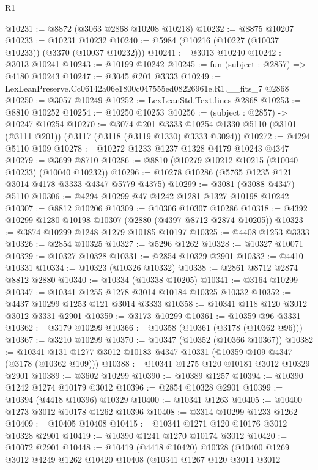 \begin{lexlean}{R1}
\begin{coremodule}
@10231 := @8872 (@3063 @2868 @10208 @10218)
@10232 := @8875 @10207
@10233 := @10231 @10232
@10240 := @5984 (@10216 (@10227 (@10037 @10233)) (@3370 (@10037 @10232)))
@10241 := @3013 @10240
@10242 := @3013 @10241
@10243 := @10199 @10242
@10245 := fun (subject : @2857) => @4180 @10243
@10247 := @3045 @201 @3333
@10249 := LexLeanPreserve.Cc06142a06e1800c047555ed08226961e.R1.__fits_7 @2868
@10250 := @3057 @10249
@10252 := LexLeanStd.Text.lines @2868
@10253 := @8810 @10252
@10254 := @10250 @10253
@10256 := (subject : @2857) -> @10247 @10254
@10270 := @3074
    @201
    @3333
    @10254
    @1330
    @5110
    (@3101 (@3111 @201))
    (@3117 (@3118 (@3119 @1330) @3333 @3094))
@10272 := @4294 @5110 @109
@10278 := @10272 @1233 @1237 @1328 @4179 @10243 @4347
@10279 := @3699 @8710
@10286 := @8810 (@10279 @10212 @10215 (@10040 @10233) (@10040 @10232))
@10296 := @10278 @10286 (@5765 @1235 @121 @3014 @4178 @3333 @4347 @5779 @4375)
@10299 := @3081 (@3088 @4347) @5110
@10306 := @4294 @10299 @47 @1242 @1281 @1327 @10198 @10242
@10307 := @8812 @10206
@10309 := @10306 @10307 @10286
@10318 := @4392 @10299 @1280 @10198 @10307 (@2880 (@4397 @8712 @2874 @10205))
@10323 := @3874 @10299 @1248 @1279 @10185 @10197
@10325 := @4408 @1253 @3333
@10326 := @2854 @10325
@10327 := @5296 @1262
@10328 := @10327 @10071
@10329 := @10327 @10328
@10331 := @2854 @10329 @2901
@10332 := @4410 @10331
@10334 := @10323 (@10326 @10332)
@10338 := @2861 @8712 @2874 @8812 @2880
@10340 := @10334 (@10338 @10205)
@10341 := @3164 @10299
@10347 := @10341 @1255 @1278 @3014 @10184 @10325 @10332
@10352 := @4437 @10299 @1253 @121 @3014 @3333
@10358 := @10341 @118 @120 @3012 @3012 @3331 @2901
@10359 := @3173 @10299
@10361 := @10359 @96 @3331
@10362 := @3179 @10299
@10366 := @10358 (@10361 (@3178 (@10362 @96)))
@10367 := @3210 @10299
@10370 := @10347 (@10352 (@10366 @10367))
@10382 := @10341 @131 @1277 @3012 @10183 @4347 @10331 (@10359 @109 @4347 (@3178 (@10362 @109)))
@10388 := @10341 @1275 @120 @10181 @3012 @10329 @2901
@10389 := @3602 @10299
@10390 := @10389 @1257
@10394 := @10390 @1242 @1274 @10179 @3012
@10396 := @2854 @10328 @2901
@10399 := @10394 (@4418 @10396) @10329
@10400 := @10341 @1263
@10405 := @10400 @1273 @3012 @10178 @1262 @10396
@10408 := @3314 @10299 @1233 @1262
@10409 := @10405 @10408
@10415 := @10341 @1271 @120 @10176 @3012 @10328 @2901
@10419 := @10390 @1241 @1270 @10174 @3012
@10420 := @10072 @2901
@10448 := @10419
    (@4418 @10420)
    @10328
    (@10400
      @1269
      @3012
      @4249
      @1262
      @10420
      @10408
      (@10341
        @1267
        @120
        @3014
        @3012

\end{coremodule}
\end{lexlean}
